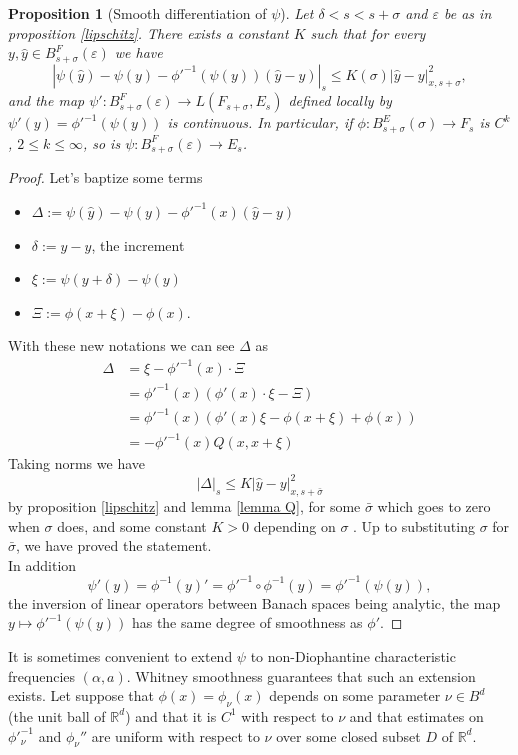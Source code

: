 \documentclass[oneside, 11pt]{amsbook}
\newcommand{\abs}[1]{{\left|#1\right|}}
\newcommand{\R}{\mathbb{R}}
\newcommand{\eps}{\varepsilon}
\newcommand{\inderiv}[1]{#1'^{-1}}
\newcommand{\0}{{(0)}}
\newcommand{\3}{{(3)}}
\newtheorem{prop}{Proposition}[section]
\numberwithin{equation}{section}
\numberwithin{defn}{section}
\numberwithin{prop}{section}
\numberwithin{cor}{section}
\numberwithin{lemma}{section}
\numberwithin{rmk}{section}
\numberwithin{corollary}{section}
\begin{document}
\begin{prop}[Smooth differentiation of $\psi$]
\label{smoothness}
 Let $\delta<s<s+\sigma$ and $\eps$ be as in proposition \ref{lipschitz}. There exists a constant $K$ such that for every $y,\hat{y}\in B_{s+\sigma}^F(\eps)$ we have \[\abs{\psi(\hat{y}) - \psi(y) - \inderiv{\phi}(\psi(y))(\hat{y} - y)}_s\leq K(\sigma) \abs{\hat{y} - y}^2_{x,s+\sigma},\] and the map $\psi': B_{s+\sigma}^F(\eps)\to L(F_{s+\sigma},E_s)$ defined locally by $\psi'(y)=\phi'^{-1}(\psi(y))$  is continuous. In particular, if $\phi: B^E_{s+\sigma}(\sigma)\to F_s$ is $C^k$, $2\leq k\leq \infty$, so is $\psi: B^F_{s+\sigma}(\eps)\to E_s$.
\end{prop}
\begin{proof}
 Let's baptize some terms
\begin{itemize}[leftmargin=*]
\item $\Delta := \psi(\hat{y}) - \psi(y) - \inderiv{\phi}(x)(\hat{y} - y) $
\item $\delta:= \hat{y} - y$, the increment
\item $\xi:= \psi(y + \delta) - \psi(y)$
\item $\Xi:= \phi(x + \xi) - \phi(x)$.
\end{itemize}
With these new notations we can see $\Delta$ as 
\begin{align*}
\Delta &= \xi - \inderiv{\phi}(x)\cdot\Xi\\
&=\inderiv{\phi}(x)(\phi'(x)\cdot\xi - \Xi)\\
& =\inderiv{\phi}(x)(\phi'(x)\xi - \phi(x+\xi) + \phi(x))\\
& = -\inderiv{\phi}(x)Q(x,x+\xi)
\end{align*}
Taking norms we have
\[\abs{\Delta}_s\leq K \abs{\hat{y} - y}^2_{x,s+\bar{\sigma}}\] by proposition \ref{lipschitz} and lemma \ref{lemma Q}, for some $\bar\sigma$ which goes to zero when $\sigma$ does, and some constant $K>0$ depending on $\sigma$ . Up to substituting $\sigma$ for $\bar{\sigma}$, we have proved the statement.\\
In addition \[\psi'(y)= \phi^{-1}(y)'= \phi'^{-1}\circ \phi^{-1}(y)= \phi'^{-1}(\psi(y)),\] the inversion of linear operators between Banach spaces being analytic, the map $y\mapsto \phi'^{-1}(\psi(y))$ has the same degree of smoothness as $\phi'$.
\end{proof}

It is sometimes convenient to extend $\psi$ to non-Diophantine characteristic frequencies $(\alpha,a)$. Whitney smoothness guarantees that such an extension exists.
Let suppose that $\phi(x)=\phi_{\nu}(x)$ depends on some parameter $\nu\in B^d$ (the unit ball of $\R^d$) and that it is $C^1$ with respect to $\nu$ and that estimates on $\phi'^{-1}_{\nu}$ and $\phi_{\nu}''$ are uniform with respect to $\nu$ over some closed subset $D$ of $\R^{d}$. 
\end{document}
